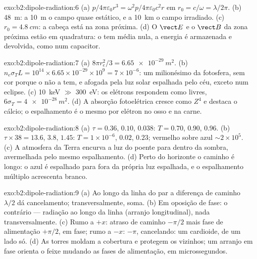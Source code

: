 \begin{solution}{exo:b2:dipole-radiation:6}
(a) $p/4\pi\varepsilon_0r^3 = \omega^2p/4\pi\varepsilon_0c^2r$ em $r_0 = c/\omega = \lambda/2\pi$. (b) \qty{48}{m}:
a \qty{10}{m} o campo quase estático, e a \qty{10}{km} o campo irradiado. (c)
$r_0 = \qty{4.8}{cm}$: a cabeça está na zona próxima. (d) O $\vect E$ e o $\vect B$
da zona próxima estão em quadratura: o  tem média nula,
a energia é armazenada e devolvida, como num capacitor.
\end{solution}

\begin{solution}{exo:b2:dipole-radiation:7}
(a) $8\pi r_e^2/3 = \qty{6.65e-29}{m^2}$. (b) $n_e\sigma_TL = 10^{14} \times 6.65 \times 10^{-29}
\times 10^9 = 7 \times 10^{-6}$: um milionésimo da fotosfera, sem cor porque o
 não a tem, e afogada pela luz solar espalhada pelo céu,
exceto num eclipse. (c) \qty{10}{keV} $\gg$ \qty{300}{eV}: os elétrons respondem como
livres, $6\sigma_T = \qty{4e-28}{m^2}$. (d) A absorção fotoelétrica cresce como $Z^4$
e destaca o cálcio; o espalhamento é o mesmo por elétron no osso
e na carne.
\end{solution}

\begin{solution}{exo:b2:dipole-radiation:8}
(a) $\tau = 0.36$, $0.10$, $0.038$: $T = 0.70$, $0.90$, $0.96$. (b) $\tau \times 38 = 13.6$,
$3.8$, $1.45$: $T = 1 \times 10^{-6}$, $0.02$, $0.23$; vermelho sobre azul $\sim 2 \times 10^5$. (c)
A atmosfera da Terra encurva a luz do poente para dentro da sombra, avermelhada
pelo mesmo espalhamento. (d) Perto do horizonte o caminho é longo: o
azul é espalhado para fora da própria luz espalhada, e o espalhamento
múltiplo acrescenta branco.
\end{solution}

\begin{solution}{exo:b2:dipole-radiation:9}
(a) Ao longo da linha do par a diferença de caminho $\lambda/2$ dá
cancelamento; transversalmente, soma. (b) Em oposição de fase: o contrário ---
radiação ao longo da linha (arranjo longitudinal), nada transversalmente. (c) Rumo a $+x$:
atraso de caminho $-\pi/2$ mais fase de alimentação $+\pi/2$, em fase; rumo a $-x$:
$-\pi$, cancelando: um cardioide, de um lado só. (d) As torres moldam a cobertura
e protegem os vizinhos; um arranjo em fase orienta o feixe mudando as fases
de alimentação, em microssegundos.
\end{solution}

